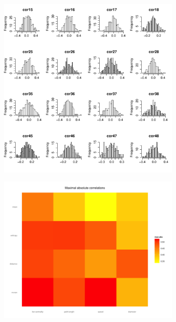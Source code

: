 \begin{figure}

\begin{subfigure}[t]{0.35\linewidth}
\includegraphics[width=\textwidth]{figures/hist_crossCorMat}
\caption{}
\end{subfigure}
\begin{subfigure}[t]{0.23\linewidth}
\vspace{-6.5cm}
\includegraphics[width=\textwidth]{figures/heatmap_maxAbsCor}\\

\end{subfigure}
\end{figure}
